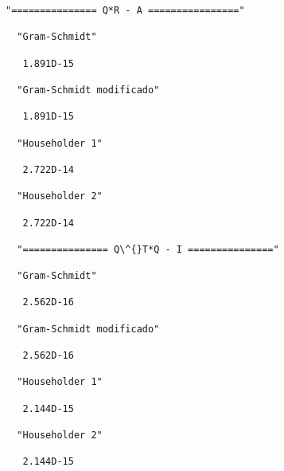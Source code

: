 \documentclass[11pt]{article}
\begin{document}
    \begin{Verbatim}[commandchars=\\\{\}]
  "=============== Q*R - A ================"

  "Gram-Schmidt"

   1.891D-15

  "Gram-Schmidt modificado"

   1.891D-15

  "Householder 1"

   2.722D-14

  "Householder 2"

   2.722D-14

  "=============== Q\^{}T*Q - I ==============="

  "Gram-Schmidt"

   2.562D-16

  "Gram-Schmidt modificado"

   2.562D-16

  "Householder 1"

   2.144D-15

  "Householder 2"

   2.144D-15
    \end{Verbatim}
\end{document}
